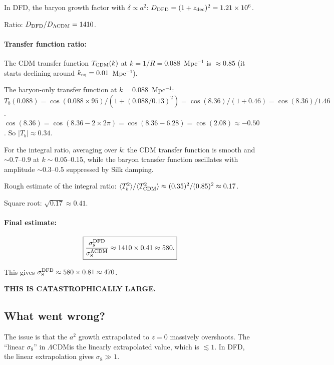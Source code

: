 \documentclass[11pt]{article}
\newcommand{\ee}[1]{\times 10^{#1}}
\newcommand{\LCDM}{$\Lambda$CDM}
\begin{document}
In DFD, the baryon growth factor with $\delta \propto a^2$:
$D_{\rm DFD} = (1+z_{\rm dec})^2 = 1.21\ee{6}$.

Ratio: $D_{\rm DFD}/D_{\Lambda\rm CDM} = 1410$.

\paragraph{Transfer function ratio:}
The CDM transfer function $T_{\rm CDM}(k)$ at $k = 1/R = 0.088$~Mpc$^{-1}$
is $\approx 0.85$ (it starts declining around $k_{\rm eq}
= 0.01$~Mpc$^{-1}$).

The baryon-only transfer function at $k = 0.088$~Mpc$^{-1}$:
$T_b(0.088) = \cos(0.088\times 95)/(1+(0.088/0.13)^2)
= \cos(8.36)/(1+0.46)
= \cos(8.36)/1.46$.
$\cos(8.36) = \cos(8.36 - 2\times 2\pi) = \cos(8.36 - 6.28)
= \cos(2.08) \approx -0.50$.
So $|T_b| \approx 0.34$.

For the integral ratio, averaging over $k$: the CDM transfer function
is smooth and $\sim 0.7$--$0.9$ at $k \sim 0.05$--$0.15$, while the
baryon transfer function oscillates with amplitude $\sim 0.3$--$0.5$
suppressed by Silk damping.

Rough estimate of the integral ratio:
$\langle T_b^2\rangle/\langle T_{\rm CDM}^2\rangle \approx
(0.35)^2/(0.85)^2 \approx 0.17$.

Square root: $\sqrt{0.17} \approx 0.41$.

\paragraph{Final estimate:}
\begin{equation}
\boxed{
\frac{\sigma_8^{\rm DFD}}{\sigma_8^{\Lambda\rm CDM}}
\approx 1410\times 0.41 \approx 580.
}
\end{equation}

This gives $\sigma_8^{\rm DFD} \approx 580\times 0.81 \approx 470$.

\textbf{THIS IS CATASTROPHICALLY LARGE.}

\subsection{What went wrong?}

The issue is that the $a^2$ growth extrapolated to $z = 0$ massively
overshoots. The ``linear $\sigma_8$'' in \LCDM is the linearly
extrapolated value, which is $\lesssim 1$. In DFD, the linear
extrapolation gives $\sigma_8 \gg 1$.
\end{document}

